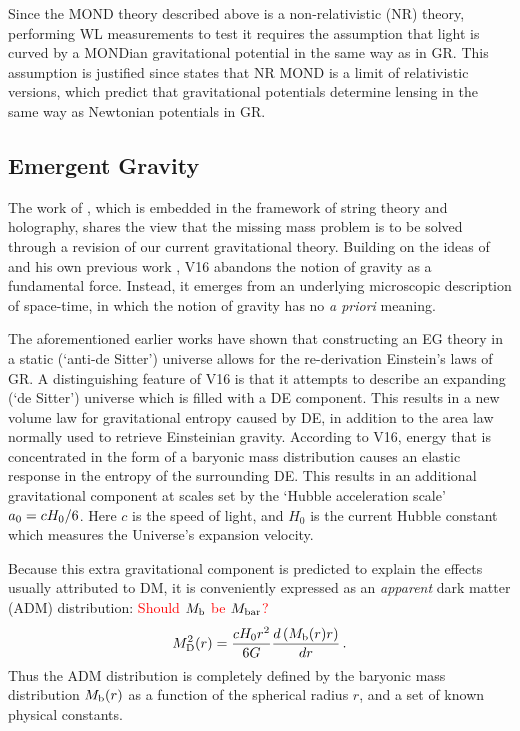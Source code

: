 \documentclass[usenatbib]{mnras}
\newcommand{\un}[1]{_{\rm #1}}
\begin{document}
Since the MOND theory described above is a non-relativistic (NR) theory, performing WL measurements to test it requires the assumption that light is curved by a MONDian gravitational potential in the same way as in GR. This assumption is justified since \citet[][while testing the MOND paradigm using GGL data from the Canada-France-Hawaii Telescope survey]{milgrom2013} states that NR MOND is a limit of relativistic versions, which predict that gravitational potentials determine lensing in the same way as Newtonian potentials in GR.

\subsection{Emergent Gravity}
\label{sec:EG}

The work of \citet[][V16 hereafter]{verlinde2016}, which is embedded in the framework of string theory and holography, shares the view that the missing mass problem is to be solved through a revision of our current gravitational theory. Building on the ideas of \cite{jacobson1995,jacobson2016,padmanabhan2010,faulkner2015} and his own previous work \cite[]{verlinde2011}, V16 abandons the notion of gravity as a fundamental force. Instead, it emerges from an underlying microscopic description of space-time, in which the notion of gravity has no \emph{a priori} meaning.

The aforementioned earlier works have shown that constructing an EG theory in a static (`anti-de Sitter') universe allows for the re-derivation Einstein's laws of GR. A distinguishing feature of V16 is that it attempts to describe an expanding (`de Sitter') universe which is filled with a DE component. This results in a new volume law for gravitational entropy caused by DE, in addition to the area law normally used to retrieve Einsteinian gravity. According to V16, energy that is concentrated in the form of a baryonic mass distribution causes an elastic response in the entropy of the surrounding DE. This results in an additional gravitational component at scales set by the `Hubble acceleration scale' $a\un{0} = c H_0/6$. Here $c$ is the speed of light, and $H_0$ is the current Hubble constant which measures the Universe's expansion velocity.

Because this extra gravitational component is predicted to explain the effects usually attributed to DM, it is conveniently expressed as an \emph{apparent} dark matter (ADM) distribution: \textcolor{red}{Should $M\un{b}$ be $M\un{bar}$?}
\begin{equation}
M\un{D}^2 (r) = \frac{  cH_0 r^2}{6G} \frac{d\left( M\un{b}(r) r \right)}{dr} \, .
\label{eq:veg_mdm}
\end{equation}
Thus the ADM distribution is completely defined by the baryonic mass distribution $M\un{b}(r)$ as a function of the spherical radius $r$, and a set of known physical constants.
\end{document}
